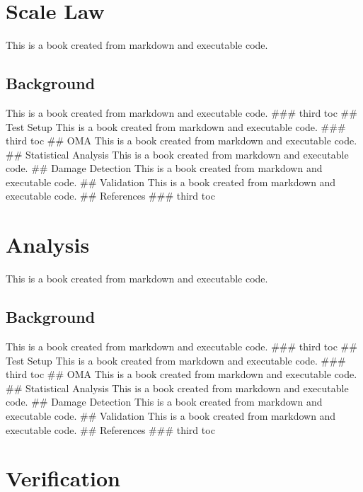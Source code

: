 \documentclass[
  letterpaper,
  DIV=11,
  numbers=noendperiod]{scrreprt}
\begin{document}
\hypertarget{scale-law}{%
\chapter{Scale Law}\label{scale-law}}

This is a book created from markdown and executable code.

\hypertarget{background-3}{%
\section{Background}\label{background-3}}

This is a book created from markdown and executable code. \#\#\# third
toc \#\# Test Setup This is a book created from markdown and executable
code. \#\#\# third toc \#\# OMA This is a book created from markdown and
executable code. \#\# Statistical Analysis This is a book created from
markdown and executable code. \#\# Damage Detection This is a book
created from markdown and executable code. \#\# Validation This is a
book created from markdown and executable code. \#\# References \#\#\#
third toc

\hypertarget{analysis}{%
\chapter{Analysis}\label{analysis}}

This is a book created from markdown and executable code.

\hypertarget{background-4}{%
\section{Background}\label{background-4}}

This is a book created from markdown and executable code. \#\#\# third
toc \#\# Test Setup This is a book created from markdown and executable
code. \#\#\# third toc \#\# OMA This is a book created from markdown and
executable code. \#\# Statistical Analysis This is a book created from
markdown and executable code. \#\# Damage Detection This is a book
created from markdown and executable code. \#\# Validation This is a
book created from markdown and executable code. \#\# References \#\#\#
third toc

\hypertarget{verification}{%
\chapter{Verification}\label{verification}}
\end{document}
